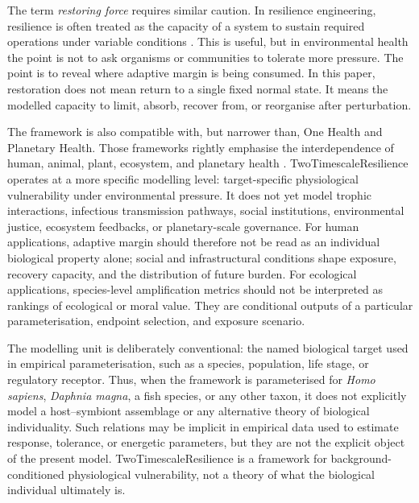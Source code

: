 The term \emph{restoring force} requires similar caution. In resilience engineering, resilience is often treated as the capacity of a system to sustain required operations under variable conditions \citep{hollnagel2013resilient}. This is useful, but in environmental health the point is not to ask organisms or communities to tolerate more pressure. The point is to reveal where adaptive margin is being consumed. In this paper, restoration does not mean return to a single fixed normal state. It means the modelled capacity to limit, absorb, recover from, or reorganise after perturbation.

The framework is also compatible with, but narrower than, One Health and Planetary Health. Those frameworks rightly emphasise the interdependence of human, animal, plant, ecosystem, and planetary health \citep{rabinowitz2018planetary,ruiz2023onehealth}. TwoTimescaleResilience operates at a more specific modelling level: target-specific physiological vulnerability under environmental pressure. It does not yet model trophic interactions, infectious transmission pathways, social institutions, environmental justice, ecosystem feedbacks, or planetary-scale governance. For human applications, adaptive margin should therefore not be read as an individual biological property alone; social and infrastructural conditions shape exposure, recovery capacity, and the distribution of future burden. For ecological applications, species-level amplification metrics should not be interpreted as rankings of ecological or moral value. They are conditional outputs of a particular parameterisation, endpoint selection, and exposure scenario.

The modelling unit is deliberately conventional: the named biological target used in empirical parameterisation, such as a species, population, life stage, or regulatory receptor. Thus, when the framework is parameterised for \emph{Homo sapiens}, \emph{Daphnia magna}, a fish species, or any other taxon, it does not explicitly model a host--symbiont assemblage or any alternative theory of biological individuality. Such relations may be implicit in empirical data used to estimate response, tolerance, or energetic parameters, but they are not the explicit object of the present model. TwoTimescaleResilience is a framework for background-conditioned physiological vulnerability, not a theory of what the biological individual ultimately is.

